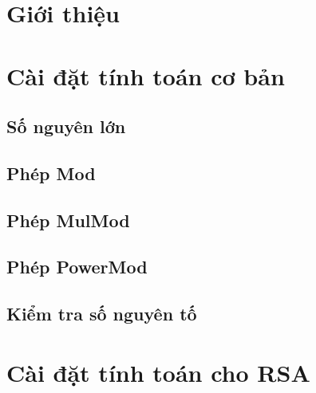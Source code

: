 \documentclass[12pt]{article}
\begin{document}



{
  \hypersetup{linkcolor=black}
  \tableofcontents\newpage\cleardoublepage
}


\section{Giới thiệu}
\newpage\cleardoublepage

\section{Cài đặt tính toán cơ bản}
\subsection{Số nguyên lớn}


\subsection{Phép Mod}


\subsection{Phép MulMod}


\subsection{Phép PowerMod}


\subsection{Kiểm tra số nguyên tố}

\cleardoublepage
\section{Cài đặt tính toán cho RSA}

\end{document}
